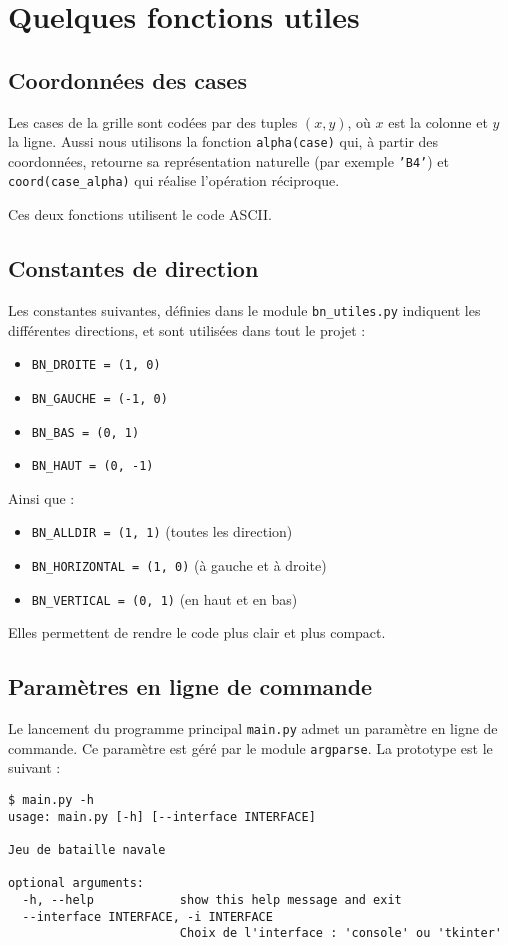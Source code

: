 \chapter{Quelques fonctions utiles}

\section{Coordonnées des cases}
Les cases de la grille sont codées par des tuples $(x,y)$, où $x$ est la colonne et $y$ la ligne. Aussi nous utilisons la fonction \texttt{alpha(case)} qui, à partir des coordonnées, retourne sa représentation naturelle (par exemple \texttt{'B4'}) et \texttt{coord(case\_alpha)} qui réalise l'opération réciproque.

Ces deux fonctions utilisent le code ASCII.

\section{Constantes de direction}
Les constantes suivantes, définies dans le module \texttt{bn\_utiles.py} indiquent les différentes directions, et sont utilisées dans tout le projet :
\begin{itemize}
\item \texttt{BN\_DROITE = (1, 0)}
\item \texttt{BN\_GAUCHE = (-1, 0)}
\item \texttt{BN\_BAS = (0, 1)}
\item \texttt{BN\_HAUT = (0, -1)}
\end{itemize}
Ainsi que :
\begin{itemize}
\item \texttt{BN\_ALLDIR = (1, 1)} (toutes les direction)
\item \texttt{BN\_HORIZONTAL = (1, 0)} (à gauche et à droite)
\item \texttt{BN\_VERTICAL = (0, 1)} (en haut et en bas)
\end{itemize}
Elles permettent de rendre le code plus clair et plus compact.

\section{Paramètres en ligne de commande}
Le lancement du programme principal \texttt{main.py} admet un paramètre en ligne de commande. Ce paramètre est géré par le module \texttt{argparse}. La prototype est le suivant :

\begin{verbatim}
$ main.py -h
usage: main.py [-h] [--interface INTERFACE]

Jeu de bataille navale

optional arguments:
  -h, --help            show this help message and exit
  --interface INTERFACE, -i INTERFACE
                        Choix de l'interface : 'console' ou 'tkinter'
\end{verbatim}